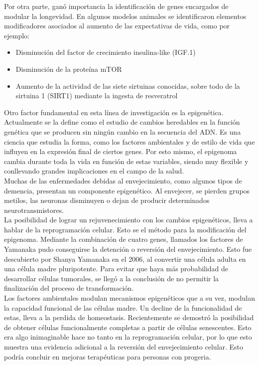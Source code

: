 Por otra parte, ganó importancia la identificación de genes encargados de modular la longevidad. En algunos modelos animales se identificaron elementos modificadores asociados al aumento de las expectativas de vida, como por ejemplo:
\begin{itemize}
	\item Disminución del factor de crecimiento insulina-like (IGF.1)
	\item Disminución de la proteína mTOR
	\item Aumento de la actividad de las siete sirtuinas conocidas, sobre todo de la sirtuina 1 (SIRT1) mediante la ingesta de resveratrol
\end{itemize}

Otro factor fundamental en esta línea de investigación es la epigenética. Actualmente se la define como el estudio de cambios heredables en la función genética que se producen sin ningún cambio en la secuencia del ADN. Es una ciencia que estudia la forma, como los factores ambientales y de estilo de vida que influyen en la expresión final de ciertos genes. Por esto mismo, el 
epigenoma cambia durante toda la vida en función de estas variables, siendo muy flexible y conllevando grandes implicaciones en el campo de la salud.\\

Muchas de las enfermedades debidas al envejecimiento, como algunos tipos de demencia, presentan un componente epigenético. Al envejecer, se pierden grupos metilos, las neuronas disminuyen o dejan de producir determinados neurotransmistores.\\

La posibilidad de lograr un rejuvenecimiento con los cambios epigenéticos, lleva a hablar de la reprogramación celular. Esto se el método para la modificación del epigenoma.	Mediante la combinación de cuatro genes, llamados los factores de Yamanaka pudo conseguirse la detención o reversión del envejecimiento. Esto fue descubierto por Shanya Yamanaka en el 2006, al convertir una célula adulta en una célula madre pluripotente. Para evitar que haya más probabilidad de desarrollar células tumorales, se llegó a la conclusión de no permitir la finalización del proceso de transformación.\\

Los factores ambientales modulan mecanismos epigenéticos que a su vez, modulan la capacidad funcional de las células madre.  Un decline de la funcionalidad de estas, lleva a la perdida de homeostasis. Recientemente se demostró la posibilidad de obtener células funcionalmente completas a partir de células senescentes. Esto era algo inimaginable hace no tanto en la reprogramación celular, por lo que esto muestra una evidencia adicional a la reversión del envejecimiento celular. Esto podría concluir en mejoras terapéuticas para personas con progeria.\\

